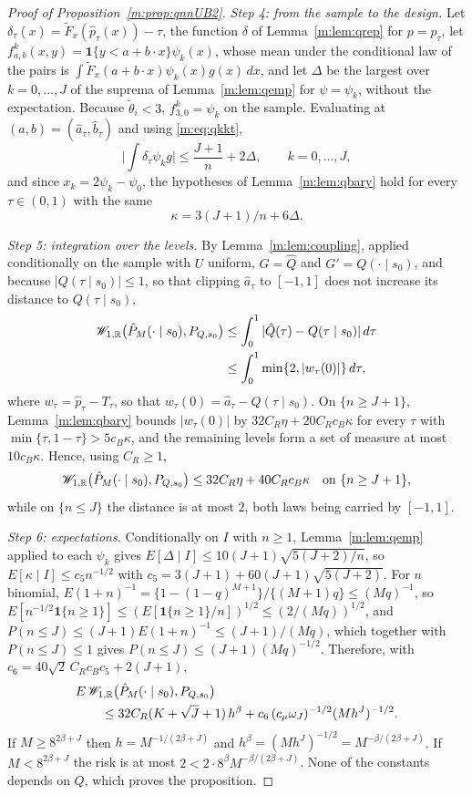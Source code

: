 \begin{proof}[Proof of Proposition~\ref{m:prop:qnnUB2}]
\emph{Step 4: from the sample to the design.} Let $\delta_\tau(x)=\tilde F_x(\hat p_\tau(x))-\tau$, the function $\delta$ of Lemma~\ref{m:lem:qrep} for $p=\hat p_\tau$, let $f^k_{a,b}(x,y)=\mathbf 1\{y<a+b\cdot x\}\psi_k(x)$, whose mean under the conditional law of the pairs is $\int\tilde F_x(a+b\cdot x)\psi_k(x)g(x)\,dx$, and let $\Delta$ be the largest over $k=0,\dots,J$ of the suprema of Lemma~\ref{m:lem:qemp} for $\psi=\psi_k$, without the expectation. Because $\tilde\theta_i<3$, $f^k_{3,0}=\psi_k$ on the sample. Evaluating at $(a,b)=(\hat a_\tau,\hat b_\tau)$ and using \eqref{m:eq:qkkt},
\[
\Big|\int\delta_\tau\psi_kg\Big|\le\frac{J+1}n+2\Delta ,\qquad k=0,\dots,J,
\]
and since $x_k=2\psi_k-\psi_0$, the hypotheses of Lemma~\ref{m:lem:qbary} hold for every $\tau\in(0,1)$ with the same
\[
\kappa=3(J+1)/n+6\Delta .
\]

\emph{Step 5: integration over the levels.} By Lemma~\ref{m:lem:coupling}, applied conditionally on the sample with $U$ uniform, $G=\hat Q$ and $G'=Q(\cdot\mid s_0)$, and because $|Q(\tau\mid s_0)|\le1$, so that clipping $\hat a_\tau$ to $[-1,1]$ does not increase its distance to $Q(\tau\mid s_0)$,
\[
\begin{aligned}
\mathscr{W}_{1,\mathbb{R}}\big(\hat P_M(\cdot\mid s_0),P_{Q,s_0}\big)&\le\int_0^1|\hat Q(\tau)-Q(\tau\mid s_0)|\,d\tau\\
&\le\int_0^1\min\{2,|w_\tau(0)|\}\,d\tau ,
\end{aligned}
\]
where $w_\tau=\hat p_\tau-T_\tau$, so that $w_\tau(0)=\hat a_\tau-Q(\tau\mid s_0)$. On $\{n\ge J+1\}$, Lemma~\ref{m:lem:qbary} bounds $|w_\tau(0)|$ by $32C_R\eta+20C_Rc_B\kappa$ for every $\tau$ with $\min\{\tau,1-\tau\}>5c_B\kappa$, and the remaining levels form a set of measure at most $10c_B\kappa$. Hence, using $C_R\ge1$,
\[
\mathscr{W}_{1,\mathbb{R}}\big(\hat P_M(\cdot\mid s_0),P_{Q,s_0}\big)\le32C_R\eta+40C_Rc_B\kappa\quad\text{on }\{n\ge J+1\},
\]
while on $\{n\le J\}$ the distance is at most $2$, both laws being carried by $[-1,1]$.

\emph{Step 6: expectations.} Conditionally on $I$ with $n\ge1$, Lemma~\ref{m:lem:qemp} applied to each $\psi_k$ gives $E[\Delta\mid I]\le10(J+1)\sqrt{5(J+2)/n}$, so $E[\kappa\mid I]\le c_5n^{-1/2}$ with $c_5=3(J+1)+60(J+1)\sqrt{5(J+2)}$. For $n$ binomial, $E(1+n)^{-1}=\{1-(1-q)^{M+1}\}/\{(M+1)q\}\le(Mq)^{-1}$, so $E[n^{-1/2}\mathbf 1\{n\ge1\}]\le(E[\mathbf 1\{n\ge1\}/n])^{1/2}\le(2/(Mq))^{1/2}$, and $P(n\le J)\le(J+1)E(1+n)^{-1}\le(J+1)/(Mq)$, which together with $P(n\le J)\le1$ gives $P(n\le J)\le(J+1)(Mq)^{-1/2}$. Therefore, with $c_6=40\sqrt2\,C_Rc_Bc_5+2(J+1)$,
\[
\begin{aligned}
&E\,\mathscr{W}_{1,\mathbb{R}}\big(\hat P_M(\cdot\mid s_0),P_{Q,s_0}\big)\\
&\qquad\le32C_R(K+\sqrt J+1)\,h^\beta+c_6\,(c_\mu\omega_J)^{-1/2}(Mh^J)^{-1/2} .
\end{aligned}
\]
If $M\ge8^{2\beta+J}$ then $h=M^{-1/(2\beta+J)}$ and $h^\beta=(Mh^J)^{-1/2}=M^{-\beta/(2\beta+J)}$. If $M<8^{2\beta+J}$ the risk is at most $2<2\cdot8^\beta M^{-\beta/(2\beta+J)}$. None of the constants depends on $Q$, which proves the proposition.
\end{proof}

